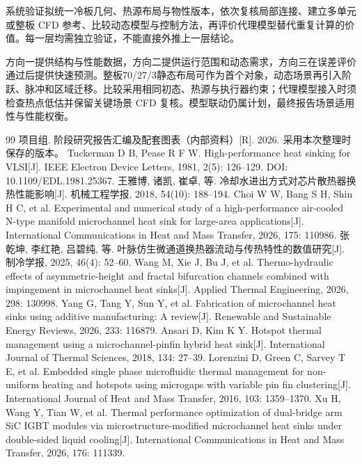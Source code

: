 \documentclass[UTF8]{midterm}
\begin{document}
系统验证拟统一冷板几何、热源布局与物性版本，依次复核局部连接、建立多单元或整板 CFD 参考、比较动态模型与控制方法，再评价代理模型替代重复计算的价值。每一层均需独立验证，不能直接外推上一层结论。

方向一提供结构与性能数据，方向二提供运行范围和动态需求，方向三在误差评价通过后提供快速预测。整板70/27/3静态布局可作为首个对象，动态场景再引入阶跃、脉冲和区域迁移。比较采用相同初态、热源与执行器约束；代理模型接入时须检查热点低估并保留关键场景 CFD 复核。模型联动仍属计划，最终报告场景适用性与性能权衡。

\begin{thebibliography}{99}
 项目组. 阶段研究报告汇编及配套图表（内部资料）[R]. 2026. 采用本次整理时保存的版本。
 Tuckerman D B, Pease R F W. High-performance heat sinking for VLSI[J]. IEEE Electron Device Letters, 1981, 2(5): 126--129. DOI: 10.1109/EDL.1981.25367.
 王雅博, 诸凯, 崔卓, 等. 冷却水进出方式对芯片散热器换热性能影响[J]. 机械工程学报, 2018, 54(10): 188--194.
 Choi W W, Bang S H, Shin H C, et al. Experimental and numerical study of a high-performance air-cooled N-type manifold microchannel heat sink for large-area applications[J]. International Communications in Heat and Mass Transfer, 2026, 175: 110986.
 张乾坤, 李红艳, 吕碧纯, 等. 叶脉仿生微通道换热器流动与传热特性的数值研究[J]. 制冷学报, 2025, 46(4): 52--60.
 Wang M, Xie J, Bu J, et al. Thermo-hydraulic effects of asymmetric-height and fractal bifurcation channels combined with impingement in microchannel heat sinks[J]. Applied Thermal Engineering, 2026, 298: 130998.
 Yang G, Tang Y, Sun Y, et al. Fabrication of microchannel heat sinks using additive manufacturing: A review[J]. Renewable and Sustainable Energy Reviews, 2026, 233: 116879.
 Ansari D, Kim K Y. Hotspot thermal management using a microchannel-pinfin hybrid heat sink[J]. International Journal of Thermal Sciences, 2018, 134: 27--39.
 Lorenzini D, Green C, Sarvey T E, et al. Embedded single phase microfluidic thermal management for non-uniform heating and hotspots using microgaps with variable pin fin clustering[J]. International Journal of Heat and Mass Transfer, 2016, 103: 1359--1370.
 Xu H, Wang Y, Tian W, et al. Thermal performance optimization of dual-bridge arm SiC IGBT modules via microstructure-modified microchannel heat sinks under double-sided liquid cooling[J]. International Communications in Heat and Mass Transfer, 2026, 176: 111339.

\end{thebibliography}
\end{document}
